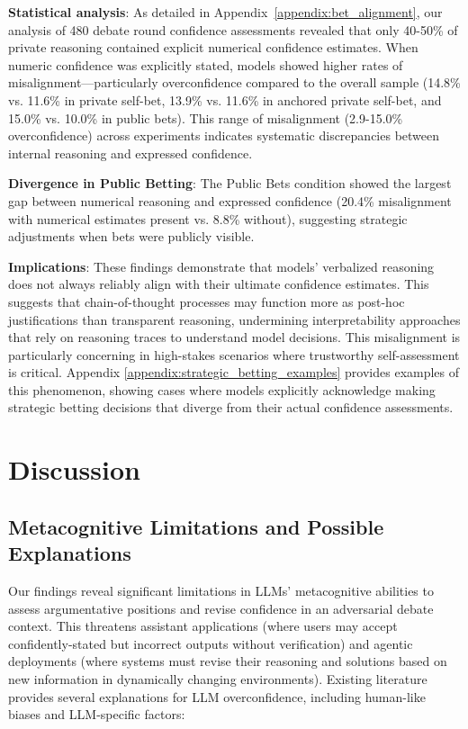 \documentclass{article}
\begin{document}
\textbf{Statistical analysis}: As detailed in Appendix~\ref{appendix:bet_alignment}, our analysis of 480 debate round confidence assessments revealed that only 40-50\% of private reasoning contained explicit numerical confidence estimates. When numeric confidence was explicitly stated, models showed higher rates of misalignment—particularly overconfidence compared to the overall sample (14.8\% vs. 11.6\% in private self-bet, 13.9\% vs. 11.6\% in anchored private self-bet, and 15.0\% vs. 10.0\% in public bets). This range of misalignment (2.9-15.0\% overconfidence) across experiments indicates systematic discrepancies between internal reasoning and expressed confidence.

\textbf{Divergence in Public Betting}: The Public Bets condition showed the largest gap between numerical reasoning and expressed confidence (20.4\% misalignment with numerical estimates present vs. 8.8\% without), suggesting strategic adjustments when bets were publicly visible.

\textbf{Implications}: These findings demonstrate that models' verbalized reasoning does not always reliably align with their ultimate confidence estimates. This suggests that chain-of-thought processes may function more as post-hoc justifications than transparent reasoning, undermining interpretability approaches that rely on reasoning traces to understand model decisions. This misalignment is particularly concerning in high-stakes scenarios where trustworthy self-assessment is critical. Appendix \ref{appendix:strategic_betting_examples} provides examples of this phenomenon, showing cases where models explicitly acknowledge making strategic betting decisions that diverge from their actual confidence assessments.

\section{Discussion}
\label{sec:discussion}

\subsection{Metacognitive Limitations and Possible Explanations}
\label{subsec:metacognitive_limitations}

Our findings reveal significant limitations in LLMs' metacognitive abilities to assess argumentative positions and revise confidence in an adversarial debate context. This threatens assistant applications (where users may accept confidently-stated but incorrect outputs without verification) and agentic deployments (where systems must revise their reasoning and solutions based on new information in dynamically changing environments). Existing literature provides several explanations for LLM overconfidence, including human-like biases and LLM-specific factors:
\end{document}
